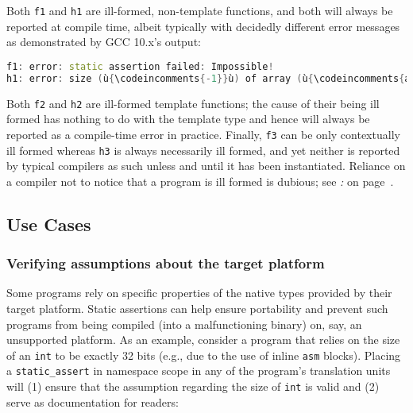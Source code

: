 \noindent Both \texttt{f1} and \texttt{h1} are ill-formed, non-template functions,
and both will always be reported at compile time, albeit typically with
decidedly different error messages as demonstrated by GCC 10.x's output:

\begin{lstlisting}[language=C++]
f1: error: static assertion failed: Impossible!
h1: error: size (ù{\codeincomments{-1}}ù) of array (ù{\codeincomments{a}}ù) is negative
\end{lstlisting}
    
\noindent Both \texttt{f2} and \texttt{h2} are ill-formed template functions; the cause of their being ill formed has nothing to do with the
template type and hence will always be reported as a compile-time error
in practice. Finally, \texttt{f3} can be only contextually ill formed
whereas \texttt{h3} is always necessarily ill formed, and yet neither is
reported by typical compilers as such unless and until it has been
instantiated. Reliance on a compiler not to notice that a program is
ill formed is dubious; see {\it{}: } on page~\pageref{static-assertions-in-templates-can-trigger-unintended-compilation-failures}.

\subsection[Use Cases]{Use Cases}\label{use-cases}

\subsubsection[Verifying assumptions about the target platform]{Verifying assumptions about the target platform}\label{verifying-assumptions-about-the-target-platform}

Some programs rely on specific properties of the native types provided
by their target platform. Static assertions can help ensure portability
and prevent such programs from being compiled (into a malfunctioning
binary) on, say, an unsupported platform. As an example, consider a
program that relies on the size of an \texttt{int} to be exactly 32
bits (e.g., due to the use of inline \texttt{asm} blocks). Placing a
\texttt{static\_assert} in namespace scope in any of the program's
translation units will (1) ensure that the assumption regarding the size
of \texttt{int} is valid and (2) serve as documentation for readers:


